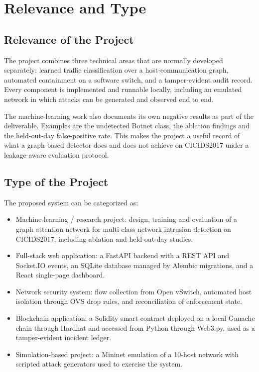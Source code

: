 \documentclass[12pt,a4paper]{report}
\begin{document}
\section{Relevance and Type}
\subsection{Relevance of the Project}
The project combines three technical areas that are normally developed separately: learned traffic classification over a host-communication graph, automated containment on a software switch, and a tamper-evident audit record. Every component is implemented and runnable locally, including an emulated network in which attacks can be generated and observed end to end.
\par
The machine-learning work also documents its own negative results as part of the deliverable. Examples are the undetected Botnet class, the ablation findings and the held-out-day false-positive rate. This makes the project a useful record of what a graph-based detector does and does not achieve on CICIDS2017 under a leakage-aware evaluation protocol.
\subsection{Type of the Project}

The proposed system can be categorized as:

\begin{itemize}
\item {Machine-learning / research project}:
design, training and evaluation of a graph attention network for multi-class network intrusion detection on CICIDS2017, including ablation and held-out-day studies.
\item {Full-stack web application}:
a FastAPI backend with a REST API and Socket.IO events, an SQLite database managed by Alembic migrations, and a React single-page dashboard.
\item {Network security system}:
flow collection from Open vSwitch, automated host isolation through OVS drop rules, and reconciliation of enforcement state.
\item {Blockchain application}:
a Solidity smart contract deployed on a local Ganache chain through Hardhat and accessed from Python through Web3.py, used as a tamper-evident incident ledger.
\item {Simulation-based project}:
a Mininet emulation of a 10-host network with scripted attack generators used to exercise the system.
\end{itemize}
\end{document}
